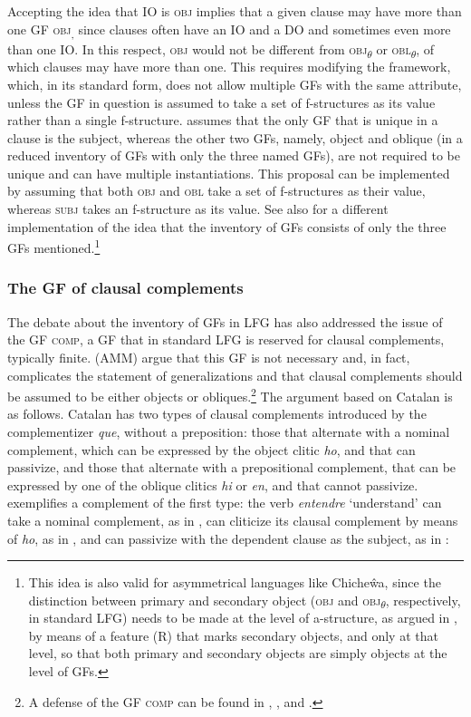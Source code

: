 \documentclass[output=paper,hidelinks]{langscibook}
\begin{document}
Accepting the idea that IO is \textsc{obj} implies that a given clause may have more than one GF \textsc{obj}\textsubscript{,} since clauses often have an IO and a DO and sometimes even more than one IO. In this respect, \textsc{obj} would not be different from \textsc{obj}\textsubscript{$\theta$} or \textsc{obl}\textsubscript{$\theta$}, of which clauses may have more than one. This requires modifying the framework, which, in its standard form, does not allow multiple GFs with the same attribute, unless the GF in question is assumed to take a set of f-structures as its value rather than a single f-structure. \citet{alsina1996the-role} assumes that the only GF that is unique in a clause is the subject, whereas the other two GFs, namely, object and oblique (in a reduced inventory of GFs with only the three named GFs), are not required to be unique and can have multiple instantiations. This proposal can be implemented by assuming that both \textsc{obj} and \textsc{obl} take a set of f-structures as their value, whereas \textsc{subj} takes an f-structure as its value. See also \citet{patejuk2016reducing} for a different implementation of the idea that the inventory of GFs consists of only the three GFs mentioned.\footnote{This idea is also valid for asymmetrical languages like Chiche\^wa, since the distinction between primary and secondary object (\textsc{obj} and \textsc{obj}\textsubscript{$\theta$}, respectively, in standard LFG) needs to be made at the level of a-structure, as argued in \citet{Alsina:PhD,Alsina2001}, by means of a feature (R) that marks secondary objects, and only at that level, so that both primary and secondary objects are simply objects at the level of GFs.}

\subsubsection{The GF of clausal complements}
\label{sec:Romance:3.1.2}

The debate about the inventory of GFs in LFG has also addressed the issue of the GF \textsc{comp}, a GF that in standard LFG is reserved for clausal complements, typically finite. \citet{AMM05} (AMM) argue that this GF is not necessary and, in fact, complicates the statement of generalizations and that clausal complements should be assumed to be either objects or obliques.\footnote{A defense of the GF \textsc{comp} can be found in \citet{DL00}, \citet{Lodrup04,Lodrup2012}, and \citet{BelyaevKozhemyakinaSerdobolskaya2017}.} The argument based on Catalan is as follows. Catalan has two types of clausal complements introduced by the complementizer \textit{que}, without a preposition: those that alternate with a nominal complement, which can be expressed by the object clitic \textit{ho}, and that can passivize, and those that alternate with a prepositional complement, that can be expressed by one of the oblique clitics \textit{hi} or \textit{en}, and that cannot passivize.  exemplifies a complement of the first type: the verb \textit{entendre} `understand' can take a nominal complement, as in , can cliticize its clausal complement by means of \textit{ho}, as in , and can passivize with the dependent clause as the subject, as in :
\end{document}
